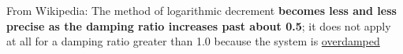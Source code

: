 \documentclass[10pt]{report}
\begin{document}
\begin{advtcolorbox}
From Wikipedia: The method of logarithmic decrement \textbf{becomes less and less precise as the damping ratio increases past about 0.5}; it does not apply at all for a damping ratio greater than 1.0 because the system is \href{https://en.m.wikipedia.org/wiki/Overdamped}{overdamped}

\end{advtcolorbox}
\end{document}
